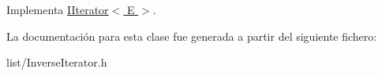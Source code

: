 Implementa \hyperlink{classIIterator_a8a73f0fb41a66fe98e5e636378759196}{I\-Iterator$<$ E $>$}.



La documentación para esta clase fue generada a partir del siguiente fichero\-:\begin{DoxyCompactItemize}
\item 
list/Inverse\-Iterator.\-h\end{DoxyCompactItemize}
